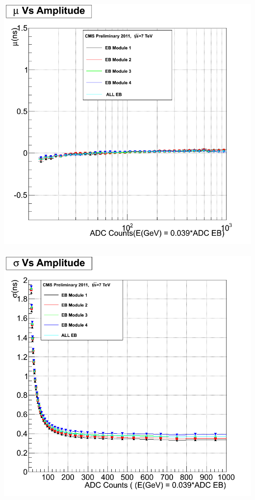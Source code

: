 \begin{center}\label{EtaDep}
\centering
\mbox{\includegraphics[scale=0.25]{THESISPLOTS/EB_TimeVsAmplitude_StabilityCMSSW_5_3_X.png} \quad
\includegraphics[scale=0.25]{THESISPLOTS/EB_SigmaVsAmplitude_Stability_In_CMSSW_53X.png}}

\end{center}

